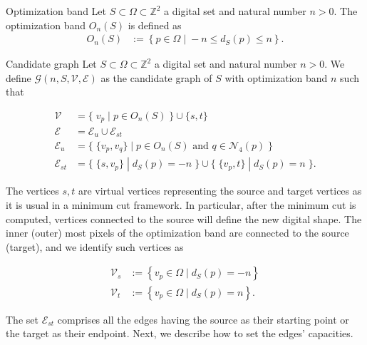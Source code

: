 \documentclass[smallextended]{svjour3}
\begin{document}
\begin{definition}{Optimization band}
Let $S \subset \Omega \subset \mathbb{Z}^2$ a digital set and natural number $n>0$. The optimization band $O_n(S)$ is defined as
\begin{align*}
	O_n(S) &:=\left\{ p \in \Omega \; | \; -n \leq d_{S}(p) \leq n \right\}.
\end{align*}
\end{definition}

\begin{definition}{Candidate graph}
Let $S \subset \Omega \subset \mathbb{Z}^2$ a digital set and natural number $n>0$. We define $\mathcal{G}(n,S,\mathcal{V},\mathcal{E})$ as the candidate graph of $S$ with optimization band $n$ such that

\begin{align*}
\mathcal{V} &= \big\{\; v_p \; | \; p \in O_n(S) \;\} \cup \{s,t \big\} \\
\mathcal{E} &= \mathcal{E}_u \cup \mathcal{E}_{st}\\
\mathcal{E}_u &= \big\{ \; \{v_p,v_q\} \; | \; p \in O_n(S) \text{ and } q \in \mathcal{N}_4(p) \; \big\} \\
\mathcal{E}_{st} &= \big\{\; \{s,v_p\} \; | \; d_S(p)=-n \; \big\} \cup \big\{\; \{v_p,t\} \; | \; d_S(p)=n \; \big\}.
\end{align*}

\end{definition}

The vertices $s,t$ are virtual vertices representing the source and target vertices as it is usual in a minimum cut framework. In particular, after the minimum cut is computed, vertices connected to the source will define the new digital shape. The inner (outer) most pixels of the optimization band are connected to the source (target), and we identify such vertices as

\begin{align*}
	\mathcal{V}_s &:=\left\{ v_p \in \Omega \; | \; d_{S}(p) = -n \right\} \\
	\mathcal{V}_t &:=\left\{ v_p \in \Omega \; | \; d_{S}(p) = n \right\}.
\end{align*}

The set $\mathcal{E}_{st}$ comprises all the edges having the source as their starting point or the target as their endpoint. Next, we describe how to set the edges' capacities.
\end{document}
